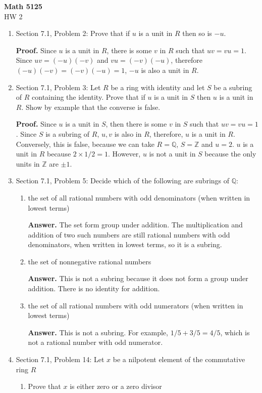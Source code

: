 \documentclass[12pt]{article}
\newcommand{\Z}{\mathbb{Z}}
\begin{document}
\begin{center}
{\bf Math 5125}\\
HW 2
\end{center}


\begin{enumerate}

\item Section 7.1, Problem 2: Prove that if $u$ is a unit in $R$ then so is $-u$.

\smallskip
{\bf Proof. }Since $u$ is a unit in $R$, there is some $v$ in $R$ such that $uv = vu = 1$. Since $uv = (-u)(-v)$ and $vu = (-v)(-u)$, therefore $(-u)(-v) = (-v)(-u) = 1$, $-u$ is also a unit in $R$.
\bigskip

\item Section 7.1, Problem 3: Let $R$ be a ring with identity and let $S$ be a subring of $R$ containing the identity. Prove that if $u$ is a unit in $S$ then $u$ is a unit in $R$. Show by example that the converse is false.

\smallskip
{\bf Proof. }Since $u$ is a unit in $S$, then there is some $v$ in $S$ such that $uv = vu = 1$. Since $S$ is a subring of $R$, $u,v$ is also in $R$, therefore, $u$ is a unit in $R$. Conversely, this is false, because we can take $R = \mathbb Q$, $S = \Z$ and $u = 2$. $u$ is a unit in $R$ because $2 \times 1/2 = 1$. However, $u$ is not a unit in $S$ because the only units in $\Z$ are $\pm1$.
\bigskip

\item Section 7.1, Problem 5: Decide which of the following are subrings of $\mathbb Q$:
\begin{enumerate}
    \item the set of all rational numbers with odd denominators (when written in lowest terms)

    \smallskip
    {\bf Answer. }The set form group under addition. The multiplication and addition of two such numbers are still rational numbers with odd denominators, when written in lowest terms, so it is a subring.
    \bigskip
    \item the set of nonnegative rational numbers

    \smallskip
    {\bf Answer. }This is not a subring because it does not form a group under addition. There is no identity for addition.
    \bigskip
    \item the set of all rational numbers with odd numerators (when written in lowest terms)

    \smallskip
    {\bf Answer. }This is not a subring. For example, $1 /5 + 3 / 5 = 4 / 5$, which is not a rational number with odd numerator.
    \bigskip
\end{enumerate}
\item Section 7.1, Problem 14: Let $x$ be a nilpotent element of the commutative ring $R$
\begin{enumerate}
    \item Prove that $x$ is either zero or a zero divisor


\end{enumerate}
\end{enumerate}
\end{document}
